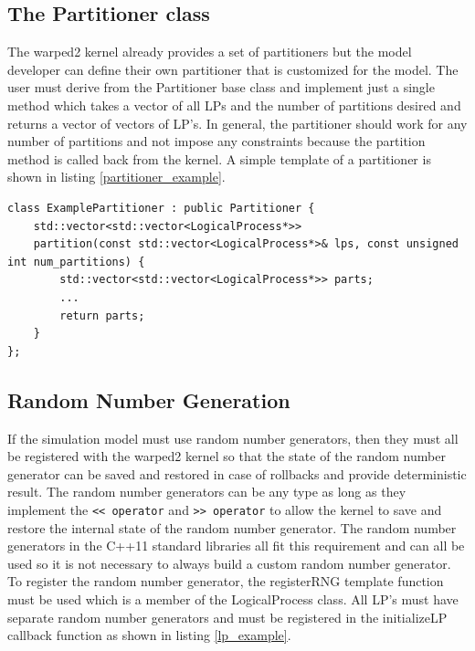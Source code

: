 \documentclass[11pt]{book}
\begin{document}
\subsection{The Partitioner class}\label{partitioner}

The warped2 kernel already provides a set of partitioners but the model developer can define
their own partitioner that is customized for the model. The user must derive from the Partitioner
base class and implement just a single method which takes a vector of all LPs and the number of
partitions desired and returns a vector of vectors of LP's. In general, the partitioner should
work for any number of partitions and not impose any constraints because the partition method
is called back from the kernel. A simple template of a partitioner is shown in listing
\ref{partitioner_example}.

\begin{lstlisting}[caption=Example \textsc{warped2} Partitioner Definition, label=partitioner_example, float]
class ExamplePartitioner : public Partitioner {
    std::vector<std::vector<LogicalProcess*>>
    partition(const std::vector<LogicalProcess*>& lps, const unsigned int num_partitions) {
        std::vector<std::vector<LogicalProcess*>> parts;
        ...
        return parts;
    }
};
\end{lstlisting}

\subsection{Random Number Generation}

If the simulation model must use random number generators, then they must all be registered
with the warped2 kernel so that the state of the random number generator can be saved and
restored in case of rollbacks and provide deterministic result. The random number generators
can be any type as long as they implement the \texttt{<< operator} and \texttt{>> operator} to
allow the kernel to save and restore the internal state of the random number generator. The
random number generators in the C++11 standard libraries\cite{c++11-rng} all fit this requirement
and can all be used so it is not necessary to always build a custom random number generator. To
register the random number generator, the registerRNG template function must be used which is
a member of the LogicalProcess class. All LP's must have separate random number generators and
must be registered in the initializeLP callback function as shown in listing \ref{lp_example}.
\end{document}
